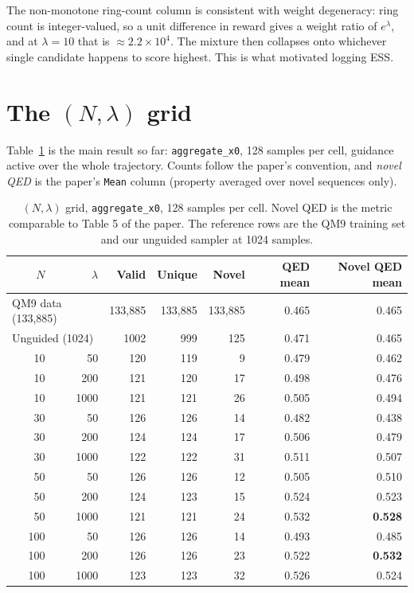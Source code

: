 \documentclass[11pt]{article}
\begin{document}
The non-monotone ring-count column is consistent with weight degeneracy: ring
count is integer-valued, so a unit difference in reward gives a weight ratio of
$e^{\lambda}$, and at $\lambda = 10$ that is $\approx 2.2 \times 10^4$. The
mixture then collapses onto whichever single candidate happens to score
highest. This is what motivated logging ESS.

\section{The $(N, \lambda)$ grid}
\label{sec:grid}

Table~\ref{tab:grid} is the main result so far: \texttt{aggregate\_x0}, 128
samples per cell, guidance active over the whole trajectory. Counts follow the
paper's convention, and \emph{novel QED} is the paper's \texttt{Mean} column
(property averaged over novel sequences only).

\begin{table}[h]
\centering
\caption{$(N, \lambda)$ grid, \texttt{aggregate\_x0}, 128 samples per cell.
Novel QED is the metric comparable to Table 5 of the paper. The reference rows
are the QM9 training set and our unguided sampler at 1024 samples.}
\label{tab:grid}
\begin{tabular}{rrrrrrr}
\toprule
$N$ & $\lambda$ & Valid & Unique & Novel & QED mean & Novel QED mean \\
\midrule
\multicolumn{2}{l}{QM9 data (133,885)} & 133,885 & 133,885 & 133,885 & 0.465 & 0.465 \\
\multicolumn{2}{l}{Unguided (1024)}    & 1002    & 999     & 125     & 0.471 & 0.465 \\
\midrule
10  & 50   & 120 & 119 & 9  & 0.479 & 0.462 \\
10  & 200  & 121 & 120 & 17 & 0.498 & 0.476 \\
10  & 1000 & 121 & 121 & 26 & 0.505 & 0.494 \\
\midrule
30  & 50   & 126 & 126 & 14 & 0.482 & 0.438 \\
30  & 200  & 124 & 124 & 17 & 0.506 & 0.479 \\
30  & 1000 & 122 & 122 & 31 & 0.511 & 0.507 \\
\midrule
50  & 50   & 126 & 126 & 12 & 0.505 & 0.510 \\
50  & 200  & 124 & 123 & 15 & 0.524 & 0.523 \\
50  & 1000 & 121 & 121 & 24 & 0.532 & \textbf{0.528} \\
\midrule
100 & 50   & 126 & 126 & 14 & 0.493 & 0.485 \\
100 & 200  & 126 & 126 & 23 & 0.522 & \textbf{0.532} \\
100 & 1000 & 123 & 123 & 32 & 0.526 & 0.524 \\
\bottomrule
\end{tabular}
\end{table}
\end{document}
